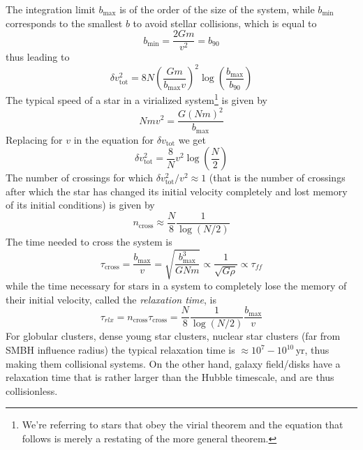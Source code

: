 The integration limit $b_{\text{max}}$ is of the order of the size of the system, while $b_{\text{min}}$ corresponds to the smallest $b$ to avoid stellar collisions, which is equal to 
\begin{equation*}
    b_{\text{min}} = \frac{2Gm}{v^{2}} = b_{90}
\end{equation*}
thus leading to 
\begin{equation*}
     \delta v^{2}_{\text{tot}} = 8N\left(\frac{Gm}{b_{\text{max}}v}\right)^{2}\log\left(\frac{b_{\text{max}}}{b_{90}}\right)
\end{equation*}
The typical speed of a star in a virialized system\footnote{We're referring to stars that obey the virial theorem and the equation that follows is merely a restating of the more general theorem.} is given by
\begin{equation*}
    Nmv^{2} = \frac{G(Nm)^{2}}{b_{\text{max}}}
\end{equation*}
Replacing for $v$ in the equation for $\delta v_{\text{tot}}$ we get 
\begin{equation*}
    \delta v^{2}_{\text{tot}} = \frac{8}{N}v^{2}\log\left(\frac{N}{2}\right)
\end{equation*}
The number of crossings for which $\delta v^{2}_{\text{tot}}/v^{2} \approx 1$ (that is the number of crossings after which the star has changed its initial velocity completely and lost memory of its initial conditions) is given by
\begin{equation*}
    n_{\text{cross}}\approx\frac{N}{8}\frac{1}{\log(N/2)}
\end{equation*}
The time needed to cross the system is 
\begin{equation*}
    \tau_{\text{cross}} = \frac{b_{\text{max}}}{v} = \sqrt{\frac{b_{\text{max}}^{3}}{GNm}} \propto \frac{1}{\sqrt{G\rho}}\propto \tau_{ff}
\end{equation*}
while the time necessary for stars in a system to completely lose the memory of their initial velocity, called the \emph{relaxation time}, is
\begin{equation}
    \tau_{rlx} = n_{\text{cross}}\tau_{\text{cross}} = \frac{N}{8}\frac{1}{\log(N/2)}\frac{b_{\text{max}}}{v}
    \label{eq:relaxation_time}
\end{equation}
For globular clusters, dense young star clusters, nuclear star clusters (far from SMBH influence radius) the typical relaxation time is $\approx 10^{7}-10^{10}\,\text{yr}$, thus making them collisional systems. On the other hand, galaxy field/disks have a relaxation time that is rather larger than the Hubble timescale, and are thus collisionless.

